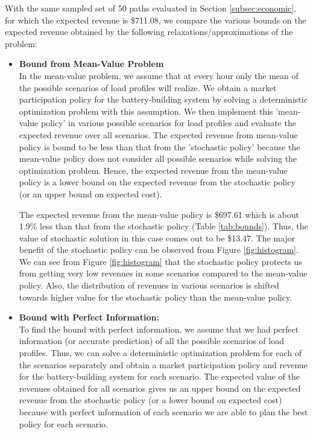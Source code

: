 \documentclass[11pt,twoside]{article}
\begin{document}
With the same sampled set of 50 paths evaluated in Section \ref{subsec:economic}, for which the expected revenue is \$711.08, we compare the various bounds on the expected revenue obtained by the following relaxations/approximations of the problem: 
\begin{itemize}
\item \textbf{Bound from Mean-Value Problem}\\
In the mean-value problem, we assume that at every hour only the mean of the possible scenarios of load profiles will realize. We obtain a market participation policy for the battery-building system by solving a deterministic optimization problem with this assumption. We then implement this 'mean-value policy' in various possible scenarios for load profiles and evaluate the expected revenue over all scenarios. The expected revenue from mean-value policy is bound to be less than that from the 'stochastic policy' because the mean-value policy does not consider all possible scenarios while solving the optimization problem. Hence, the expected revenue from the mean-value policy is a lower bound on the expected revenue from the stochastic policy (or an upper bound on expected cost). 

The expected revenue from the mean-value policy is \$697.61 which is about 1.9\% less than that from the stochastic policy (Table \ref{tab:bounds}). Thus, the value of stochastic solution in this case comes out to be \$13.47. The major benefit of the stochastic policy can be observed from Figure \ref{fig:histogram}. We can see from Figure \ref{fig:histogram} that the stochastic policy protects us from getting very low revenues in some scenarios compared to the mean-value policy. Also, the distribution of revenues in various scenarios is shifted towards higher value for the stochastic policy than the mean-value policy.

\item \textbf{Bound with Perfect Information:}\\
To find the bound with perfect information, we assume that we had perfect information (or accurate prediction) of all the possible scenarios of load profiles. Thus, we can solve a deterministic optimization problem for each of the scenarios separately and obtain a market participation policy and revenue for the battery-building system for each scenario. The expected value of the revenues obtained for all scenarios gives us an upper bound on the expected revenue from the stochastic policy (or a lower bound on expected cost) because with perfect information of each scenario we are able to plan the best policy for each scenario.


\end{itemize}
\end{document}
